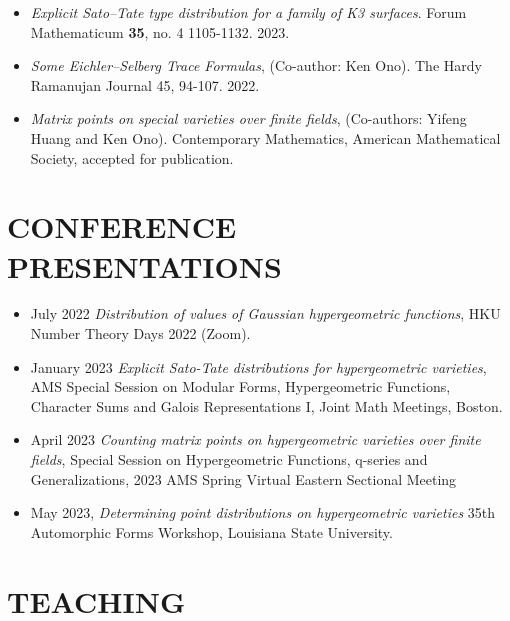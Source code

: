 \documentclass[margin, 10pt]{res} %
\begin{document}
\begin{resume}
\begin{itemize}
    \item \emph{Explicit Sato--Tate type distribution for a family of K3 surfaces}.\newline
    Forum Mathematicum {\bf 35}, no. 4 1105-1132. 2023.

    \item \emph{Some Eichler--Selberg Trace Formulas}, (Co-author: Ken Ono).\newline
    The Hardy Ramanujan Journal 45, 94-107. 2022.

    \item \emph{Matrix points on special varieties over finite fields}, (Co-authors: Yifeng Huang and Ken Ono).\newline
    Contemporary Mathematics, American Mathematical Society, accepted
for publication.
\end{itemize}

\section{CONFERENCE PRESENTATIONS}

\begin{itemize}
    \item July 2022 \emph{ Distribution of values of Gaussian hypergeometric functions},\newline
    HKU Number Theory Days 2022 (Zoom).
    \item  January 2023 \emph{Explicit Sato-Tate distributions for hypergeometric varieties}, \newline
    AMS Special Session on Modular Forms, Hypergeometric Functions, Character Sums and Galois Representations I, Joint Math Meetings, Boston.
    \item April 2023 \emph{ Counting matrix points on hypergeometric varieties over finite fields},\newline
     Special Session on Hypergeometric Functions, q-series and Generalizations, 2023 AMS Spring Virtual Eastern Sectional Meeting
     \item May 2023, \emph{Determining point distributions on hypergeometric varieties}\newline
     35th Automorphic Forms Workshop, Louisiana State University.
\end{itemize}

\section{TEACHING}


\end{resume}
\end{document}

